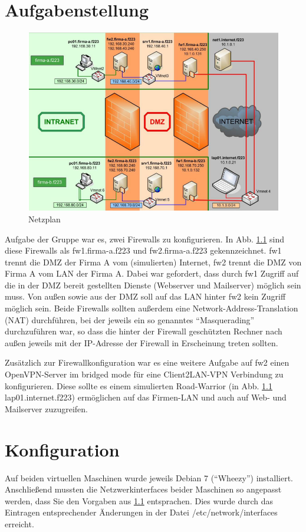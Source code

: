 \chapter{Aufgabenstellung}
\begin{figure}
	\centering
		\includegraphics[width=1.00\textwidth]{figures/netzplan.PNG}
	\caption{Netzplan \cite{Neuschwander2014}}
	\label{fig:netzplan}
\end{figure}

Aufgabe der Gruppe war es, zwei Firewalls zu konfigurieren. In Abb. \ref{fig:netzplan} sind diese Firewalls als fw1.firma-a.f223 und fw2.firma-a.f223 gekennzeichnet. fw1 trennt die DMZ der Firma A vom (simulierten) Internet, fw2 trennt die DMZ von Firma A vom LAN der Firma A. Dabei war gefordert, dass durch fw1 Zugriff auf die in der DMZ bereit gestellten Dienste (Webserver und Mailserver) möglich sein muss. Von außen sowie aus der DMZ soll auf das LAN hinter fw2 kein Zugriff möglich sein. Beide Firewalls sollten außerdem eine Network-Address-Translation (NAT) durchführen, bei der jeweils ein so genanntes "`Masquerading"' durchzuführen war, so dass die hinter der Firewall geschützten Rechner nach außen jeweils mit der IP-Adresse der Firewall in Erscheinung treten sollten.

Zusätzlich zur Firewallkonfiguration war es eine weitere Aufgabe auf fw2 einen OpenVPN-Server im bridged mode für eine Client2LAN-VPN Verbindung zu konfigurieren. Diese sollte es einem simulierten Road-Warrior (in Abb. \ref{fig:netzplan} lap01.internet.f223) ermöglichen auf das Firmen-LAN und auch auf Web- und Mailserver zuzugreifen.

\chapter{Konfiguration}
Auf beiden virtuellen Maschinen wurde jeweils Debian 7 ("`Wheezy"') installiert. Anschließend mussten die Netzwerkinterfaces beider Maschinen so angepasst werden, dass Sie den Vorgaben aus \ref{fig:netzplan} entsprachen. Dies wurde durch das Eintragen entsprechender Änderungen in der Datei /etc/network/interfaces erreicht.

